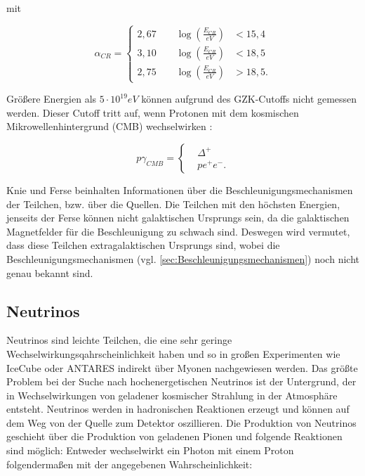 mit 

\begin{equation*}
\alpha_{CR}=	
\left\{
\begin{aligned}
2,67 \qquad \log\left( \frac{E_{CR}}{eV} \right) &< 15,4 \\
3,10 \qquad \log\left( \frac{E_{CR}}{eV} \right) &< 18,5 \\ 
2,75 \qquad \log\left( \frac{E_{CR}}{eV} \right) &> 18,5.
\end{aligned}
\right.
\end{equation*}

Größere Energien als $5 \cdot 10^{19} \si{eV}$ können aufgrund des GZK-Cutoffs \cite{Greisen}\cite{ZatsepinKuzmin} nicht gemessen werden. 
Dieser Cutoff tritt auf, wenn Protonen mit dem kosmischen Mikrowellenhintergrund (CMB) wechselwirken \cite{DissBecker}: 

\begin{equation*}
p\gamma_{CMB}=	
\left\{
\begin{aligned}
& \Delta^+ \\
& p e^+ e^- .
\end{aligned}
\right.
\end{equation*}

Knie und Ferse beinhalten Informationen über die Beschleunigungsmechanismen der Teilchen, bzw. über die Quellen.
Die Teilchen mit den höchsten Energien, jenseits der Ferse können nicht galaktischen Ursprungs sein, da die galaktischen Magnetfelder für die Beschleunigung zu schwach sind. 
Deswegen wird vermutet, dass diese Teilchen extragalaktischen Ursprungs sind, wobei die Beschleunigungsmechanismen (vgl. \autoref{sec:Beschleunigungsmechanismen}) noch nicht genau bekannt sind.

\subsection{Neutrinos}
Neutrinos sind leichte Teilchen, die eine sehr geringe Wechselwirkungsqahrscheinlichkeit haben und so in großen Experimenten wie IceCube\cite{Icecube} oder ANTARES\cite{ANTARES} indirekt über Myonen nachgewiesen werden.
Das größte Problem bei der Suche nach hochenergetischen Neutrinos ist der Untergrund, der in Wechselwirkungen von geladener kosmischer Strahlung in der Atmosphäre entsteht.
Neutrinos werden in hadronischen Reaktionen erzeugt und können auf dem Weg von der Quelle zum Detektor oszillieren.
Die Produktion von Neutrinos geschieht über die Produktion von geladenen Pionen und folgende Reaktionen sind möglich:
Entweder wechselwirkt ein Photon mit einem Proton folgendermaßen mit der angegebenen Wahrscheinlichkeit\cite{DissBecker}:

